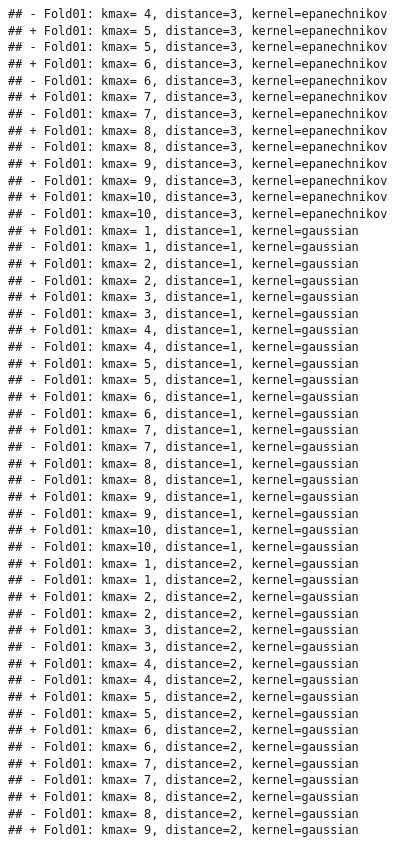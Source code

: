 \documentclass[
]{article}
\begin{document}
\begin{verbatim}
## - Fold01: kmax= 4, distance=3, kernel=epanechnikov 
## + Fold01: kmax= 5, distance=3, kernel=epanechnikov 
## - Fold01: kmax= 5, distance=3, kernel=epanechnikov 
## + Fold01: kmax= 6, distance=3, kernel=epanechnikov 
## - Fold01: kmax= 6, distance=3, kernel=epanechnikov 
## + Fold01: kmax= 7, distance=3, kernel=epanechnikov 
## - Fold01: kmax= 7, distance=3, kernel=epanechnikov 
## + Fold01: kmax= 8, distance=3, kernel=epanechnikov 
## - Fold01: kmax= 8, distance=3, kernel=epanechnikov 
## + Fold01: kmax= 9, distance=3, kernel=epanechnikov 
## - Fold01: kmax= 9, distance=3, kernel=epanechnikov 
## + Fold01: kmax=10, distance=3, kernel=epanechnikov 
## - Fold01: kmax=10, distance=3, kernel=epanechnikov 
## + Fold01: kmax= 1, distance=1, kernel=gaussian 
## - Fold01: kmax= 1, distance=1, kernel=gaussian 
## + Fold01: kmax= 2, distance=1, kernel=gaussian 
## - Fold01: kmax= 2, distance=1, kernel=gaussian 
## + Fold01: kmax= 3, distance=1, kernel=gaussian 
## - Fold01: kmax= 3, distance=1, kernel=gaussian 
## + Fold01: kmax= 4, distance=1, kernel=gaussian 
## - Fold01: kmax= 4, distance=1, kernel=gaussian 
## + Fold01: kmax= 5, distance=1, kernel=gaussian 
## - Fold01: kmax= 5, distance=1, kernel=gaussian 
## + Fold01: kmax= 6, distance=1, kernel=gaussian 
## - Fold01: kmax= 6, distance=1, kernel=gaussian 
## + Fold01: kmax= 7, distance=1, kernel=gaussian 
## - Fold01: kmax= 7, distance=1, kernel=gaussian 
## + Fold01: kmax= 8, distance=1, kernel=gaussian 
## - Fold01: kmax= 8, distance=1, kernel=gaussian 
## + Fold01: kmax= 9, distance=1, kernel=gaussian 
## - Fold01: kmax= 9, distance=1, kernel=gaussian 
## + Fold01: kmax=10, distance=1, kernel=gaussian 
## - Fold01: kmax=10, distance=1, kernel=gaussian 
## + Fold01: kmax= 1, distance=2, kernel=gaussian 
## - Fold01: kmax= 1, distance=2, kernel=gaussian 
## + Fold01: kmax= 2, distance=2, kernel=gaussian 
## - Fold01: kmax= 2, distance=2, kernel=gaussian 
## + Fold01: kmax= 3, distance=2, kernel=gaussian 
## - Fold01: kmax= 3, distance=2, kernel=gaussian 
## + Fold01: kmax= 4, distance=2, kernel=gaussian 
## - Fold01: kmax= 4, distance=2, kernel=gaussian 
## + Fold01: kmax= 5, distance=2, kernel=gaussian 
## - Fold01: kmax= 5, distance=2, kernel=gaussian 
## + Fold01: kmax= 6, distance=2, kernel=gaussian 
## - Fold01: kmax= 6, distance=2, kernel=gaussian 
## + Fold01: kmax= 7, distance=2, kernel=gaussian 
## - Fold01: kmax= 7, distance=2, kernel=gaussian 
## + Fold01: kmax= 8, distance=2, kernel=gaussian 
## - Fold01: kmax= 8, distance=2, kernel=gaussian 
## + Fold01: kmax= 9, distance=2, kernel=gaussian 

\end{verbatim}
\end{document}
